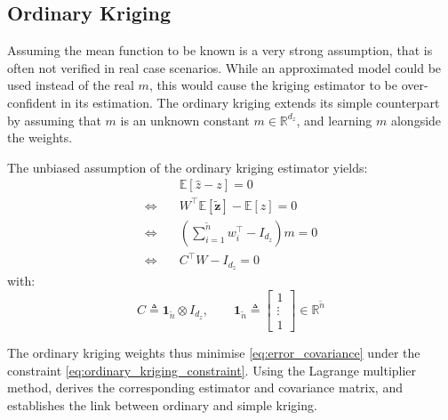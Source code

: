 \subsection{Ordinary Kriging}

Assuming the mean function to be known is a very strong assumption, that is often not verified in real case scenarios. While an approximated model could be used instead of the real $m$, this would cause the kriging estimator to be over-confident in its estimation. The ordinary kriging extends its simple counterpart by assuming that $m$ is an unknown constant $m\in\mathbb{R}^{d_z}$, and learning $m$ alongside the weights.

The unbiased assumption of the ordinary kriging estimator yields:
\begin{equation}
	\begin{aligned}
	&\mathbb{E}[\hat{z}-z]=0\\
	\iff\quad&W^\top\mathbb{E}[\tilde{\mathbf{z}}]-\mathbb{E}[z]=0\\
	\iff\quad&\left(\sum_{i=1}^{\tilde{n}}w_i^\top-I_{d_z}\right)m=0\\
	\iff\quad&C^\top W-I_{d_z}=0
	\end{aligned}\label{eq:ordinary_kriging_constraint}
\end{equation}
with:
\begin{equation}
	C\triangleq\mathbf{1}_{\tilde{n}}\otimes I_{d_z},\qquad\mathbf{1}_{\tilde{n}}\triangleq\begin{bmatrix}1\\\vdots\\1\end{bmatrix}\in\mathbb{R}^{\tilde{n}}
\end{equation}

The ordinary kriging weights thus minimise \eqref{eq:error_covariance} under the constraint \eqref{eq:ordinary_kriging_constraint}. Using the Lagrange multiplier method,  derives the corresponding estimator and covariance matrix, and  establishes the link between ordinary and simple kriging.

